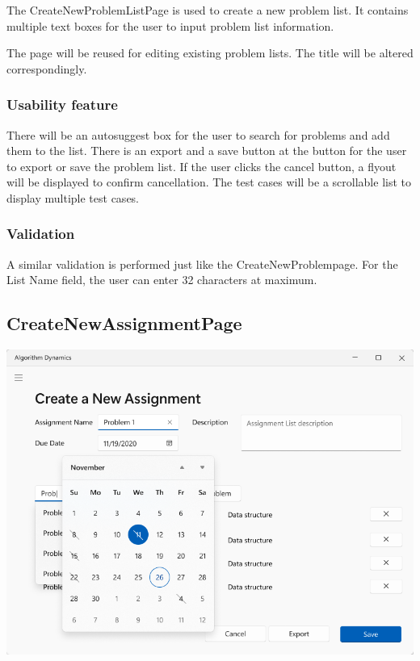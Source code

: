 \documentclass[a4paper]{report}
\begin{document}
The CreateNewProblemListPage is used to create a new problem list. It contains multiple text boxes for the user to input problem list information.

The page will be reused for editing existing problem lists. The title will be altered correspondingly.

\subsubsection{Usability feature}

There will be an autosuggest box for the user to search for problems and add them to the list. There is an export and a save button at the button for the user to export or save the problem list. If the user clicks the cancel button, a flyout will be displayed to confirm cancellation. The test cases will be a scrollable list to display multiple test cases.

\subsubsection{Validation}

A similar validation is performed just like the CreateNewProblempage. For the List Name field, the user can enter 32 characters at maximum.

\subsection{CreateNewAssignmentPage}
\label{sec:CreateNewAssignmentPageDesign}

\includegraphics[width=\textwidth, height=\textheight, keepaspectratio]{CreateNewAssignmentPage-design}
\end{document}
